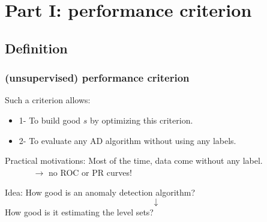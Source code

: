 \documentclass[10pt]{beamer}
\newcommand\blue{\color{blue} }
\begin{document}
\section{Part I: performance criterion}
\subsection{Definition}

\begin{frame}
\frametitle{(unsupervised) performance criterion}


\begin{block}{Such a criterion allows:}
\begin{itemize}
\item{1-} To build good {\blue $s$} by optimizing this criterion.
\item{2-} To evaluate any AD algorithm without using any labels.
\end{itemize}
\end{block}

\begin{block}{Practical motivations:}
Most of the time, data come without any label.\\
{\footnotesize ~~~~~~ $\to$ no ROC or PR curves!}
\end{block}

\begin{block}{Idea:}
\centering
How good is an anomaly detection algorithm?
$$\downarrow$$
How good is it estimating the level sets?
\end{block}
\end{frame}
\end{document}
